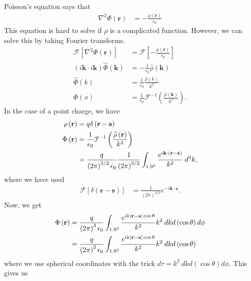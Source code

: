\documentclass[10pt]{mypackage}
\begin{document}
\begin{example}
  Poisson's equation says that
  \begin{align*}
    \nabla^2 \Phi\left(\mathbf{r}\right) &= -\frac{\rho\left(\mathbf{r}\right)}{\epsilon_0}
  \end{align*}
  This equation is hard to solve if $\rho$ is a complicated function. However, we can solve this by taking Fourier transforms.
  \begin{align*}
    \mathcal{F}\left[\nabla^2 \Phi\left(\mathbf{r}\right)\right] &= \mathcal{F}\left[-\frac{\rho\left(\mathbf{r}\right)}{\epsilon_0}\right]\\
    \left(i\mathbf{k}\cdot i\mathbf{k}\right)\widehat{\Phi}\left(\mathbf{k}\right) &= -\frac{1}{\epsilon_0}\widehat{\rho}\left(\mathbf{k}\right)\\
    \widehat{\Phi}\left(k\right) &= \frac{1}{\epsilon_0} \frac{\widehat{\rho}\left(k\right)}{k^2}\\
    \Phi\left(x\right) &= \frac{1}{\epsilon_0}\mathcal{F}^{-1}\left(\frac{\widehat{\rho}\left(\mathbf{k}\right)}{k^2}\right).
  \end{align*}
  In the case of a point charge, we have
  \begin{align*}
    \rho\left(\mathbf{r}\right) &= q\delta\left(\mathbf{r} - \mathbf{s}\right)\\
    \Phi\left(\mathbf{r}\right) &= \frac{1}{\epsilon_0}\mathcal{F}^{-1}\left(\frac{\widehat{\rho}\left(\mathbf{r}\right)}{k^2}\right)\\
                                &= \frac{q}{\left(2\pi\right)^{3/2}\epsilon_0}\frac{1}{\left(2\pi\right)^{3/2}}\int_{1.9^3}^{} \frac{e^{i\mathbf{k}\cdot\left(\mathbf{r}-\mathbf{s}\right)}}{k^2}\:d^3k,
  \end{align*}
  where we have used
  \begin{align*}
    \mathcal{F}\left[\delta\left(\mathbf{r}-\mathbf{s}\right)\right] &= \frac{1}{\left(2\pi\right)^{3/2}}e^{-i\mathbf{k}\cdot \mathbf{s}}.
  \end{align*}
  Now, we get
  \begin{align*}
    \Phi\left(\mathbf{r}\right) &= \frac{q}{\left(2\pi\right)^3\epsilon_0}\int_{1.9^3}^{} \frac{e^{ik\left\vert \mathbf{r}-\mathbf{s} \right\vert\cos\theta}}{k^2}k^2\:dkd\left(\cos\theta\right)d\phi\\
                                &= \frac{q}{\left(2\pi\right)^2\epsilon_0} \int_{1.9^3}^{}\frac{e^{ik\left\vert \mathbf{r}-\mathbf{s} \right\vert\cos\theta}}{k^2}k^2\:dkd\left(\cos\theta\right)
  \end{align*}
  where we use spherical coordinates with the trick $d\tau = k^2\: dkd\left(\cos\theta\right)d\phi$. This gives us
  

\end{example}
\end{document}
